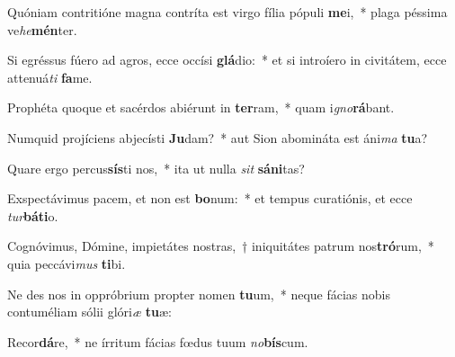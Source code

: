 \item Quóniam contritióne magna contríta est virgo fília pópuli \textbf{me}i,~* plaga péssima ve\textit{he}\textbf{mén}ter.
\item Si egréssus fúero ad agros, ecce occísi \textbf{glá}dio:~* et si introíero in civitátem, ecce attenuá\textit{ti} \textbf{fa}me.
\item Prophéta quoque et sacérdos abiérunt in \textbf{ter}ram,~* quam i\textit{gno}\textbf{rá}bant.
\item Numquid projíciens abjecísti \textbf{Ju}dam?~* aut Sion abomináta est áni\textit{ma} \textbf{tu}a?
\item Quare ergo percus\textbf{sís}ti nos,~* ita ut nulla \textit{sit} \textbf{sá}\textbf{ni}tas?
\item Exspectávimus pacem, et non est \textbf{bo}num:~* et tempus curatiónis, et ecce \textit{tur}\textbf{bá}\textbf{ti}o.
\item Cognóvimus, Dómine, impietátes nostras,~† iniquitátes patrum nos\textbf{tró}rum,~* quia peccávi\textit{mus} \textbf{ti}bi.
\item Ne des nos in oppróbrium propter nomen \textbf{tu}um,~* neque fácias nobis contuméliam sólii glóri\textit{æ} \textbf{tu}æ:
\item Recor\textbf{dá}re,~* ne írritum fácias fœdus tuum \textit{no}\textbf{bís}cum.
